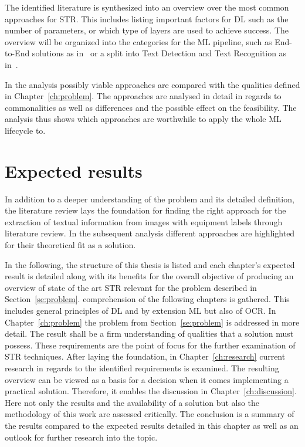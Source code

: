 The identified literature is synthesized into an overview over the most common approaches for
\ac{STR}.
This includes listing important factors for \ac{DL} such as the number of parameters, or which
type of layers are used to achieve success.
The overview will be organized into the categories for the \ac{ML} pipeline, such as End-to-End
solutions as in~\cite{xing_convolutional_2019} or a split into Text Detection and Text Recognition
as in~\cite{yang_learning_2021, chen_improvement_2018}.

In the analysis possibly viable approaches are compared with the qualities defined
in Chapter~\ref{ch:problem}.
The approaches are analysed in detail in regards to commonalities as well as differences and the
possible effect on the feasibility.
The analysis thus shows which approaches are worthwhile to apply the whole \ac{ML} lifecycle to.

\section{Expected results}
In addition to a deeper understanding of the problem and its detailed definition, the literature
review lays the foundation for finding the right approach for the extraction of textual
information from images with equipment labels through literature review.
In the subsequent analysis different approaches are highlighted for their theoretical fit as a solution.

In the following, the structure of this thesis is listed and each chapter's expected
result is detailed along with its benefits for the overall objective of producing an overview of
state of the art \ac{STR} relevant for the problem described in Section~\ref{se:problem}.
comprehension of the following chapters is gathered.
This includes general principles of \ac{DL} and by extension \ac{ML} but also of \ac{OCR}.\@
In Chapter~\ref{ch:problem} the problem from Section~\ref{se:problem} is addressed in more detail.
The result shall be a firm understanding of qualities that a solution must possess.
These requirements are the point of focus for the further examination of \ac{STR} techniques.
After laying the foundation, in Chapter~\ref{ch:research} current research in regards to the
identified requirements is examined.
The resulting overview can be viewed as a basis for a decision when it comes implementing a practical
solution.
Therefore, it enables the discussion in Chapter~\ref{ch:discussion}.
Here not only the results and the availability of a solution but also the methodology of this work
are assessed critically.
The conclusion is a summary of the results compared to the expected results detailed in this chapter
as well as an outlook for further research into the topic.

